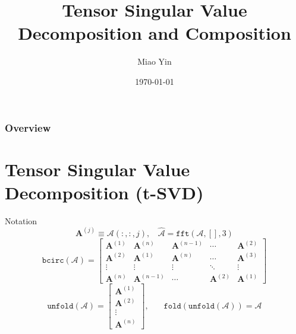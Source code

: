 \documentclass{beamer}
\title[t-SVD]{Tensor Singular Value Decomposition and Composition} %
\author{Miao Yin} %
\institute[] %
{
Rutgers University \\ %
\medskip
\textit{miao.yin@rutgers.edu} %
}
\date{\today} %
\begin{document}
\begin{frame}
\titlepage %
\end{frame}

\begin{frame}
\frametitle{Overview} %
\tableofcontents %
\end{frame}


\section{Tensor Singular Value Decomposition (t-SVD)} %

\begin{frame}{Notation}
$$
\mathbf{A}^{(j)}\equiv\mathcal{A}(:,:,j),~~~~\hat{\mathcal{A}} = \texttt{fft}(\mathcal{A}, [], 3)
$$
$$
\texttt{bcirc}(\mathcal{A})=\left[
  \begin{matrix}
   \mathbf{A}^{(1)} & \mathbf{A}^{(n)} & \mathbf{A}^{(n-1)} & \cdots & \mathbf{A}^{(2)} \\
   \mathbf{A}^{(2)} & \mathbf{A}^{(1)} & \mathbf{A}^{(n)} & \cdots & \mathbf{A}^{(3)} \\
   \vdots & \vdots & \vdots & \ddots & \vdots \\
    \mathbf{A}^{(n)} & \mathbf{A}^{(n-1)} & \cdots & \mathbf{A}^{(2)} & \mathbf{A}^{(1)}
  \end{matrix}
  \right]
$$
$$
\texttt{unfold}(\mathcal{A})=\left[
  \begin{matrix}
    \mathbf{A}^{(1)} \\
    \mathbf{A}^{(2)} \\
    \vdots \\
    \mathbf{A}^{(n)}
  \end{matrix}
\right], ~~~~~~~~\texttt{fold}(\texttt{unfold}(\mathcal{A}))=\mathcal{A}
$$
\end{frame}
\end{document}
